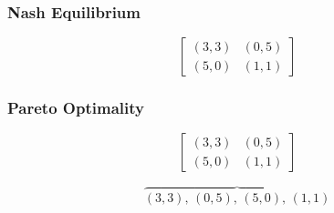 \begin{frame}
    \frametitle{Nash Equilibrium}
    
    \centering
    \begin{equation*}
        \begin{bmatrix}
            (3,3) & (0,5) \\
            (5,0) & (1,1)
        \end{bmatrix}
    \end{equation*}

\end{frame}



\begin{frame}
    \frametitle{Pareto Optimality}
    
    \centering
    \begin{equation*}
        \begin{bmatrix}
            (3,3) & (0,5) \\
            (5,0) & (1,1)
        \end{bmatrix}
    \end{equation*}

    \vspace{-0.5cm}
    \begin{equation*}
        \overbrace{(3,3), \, (0,5), \, (5,0), \, (1,1)}
    \end{equation*}
\end{frame}


